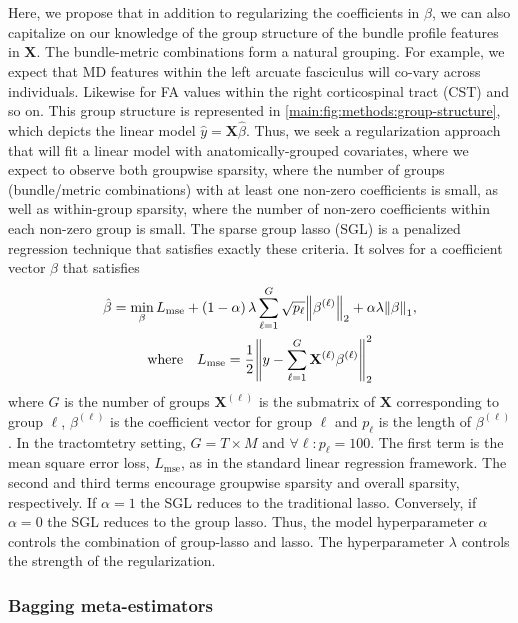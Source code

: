 \documentclass[10pt,%
               aps,%
               prl,%
               preprint,%
               superscriptaddress,%
               preprintnumbers,%
               amsmath,%
               floatfix,%
               endfloats*]{revtex4-2}
\begin{document}
Here, we propose that in addition to regularizing the coefficients in
$\hat{\beta}$, we can also capitalize on our knowledge of the group structure
of the bundle profile features in $\mathbf{X}$. The bundle-metric
combinations form a natural grouping. For example, we expect that MD features
within the left arcuate fasciculus will co-vary across individuals. Likewise
for FA values within the right corticospinal tract (CST) and so on. This
group structure is represented in \cref{main:fig:methods:group-structure}, which
depicts the linear model $\hat{y} = \mathbf{X} \hat{\beta}$. Thus, we seek a
regularization approach that will fit a linear model with
anatomically-grouped covariates, where we expect to observe both groupwise
sparsity, where the number of groups (bundle/metric combinations) with at
least one non-zero coefficients is small, as well as within-group sparsity,
where the number of non-zero coefficients within each non-zero group is
small. The sparse group lasso (SGL) is a penalized regression technique that
satisfies exactly these criteria\cite{simon2013sparse}. It solves for a
coefficient vector $\hat{\beta}$ that satisfies
\begin{multline}
    \hat{\beta} = \min_\beta L_{\text{mse}}
    + \left( 1 - \alpha \right) \lambda \displaystyle \sum_{\ell = 1}^{G}
    \sqrt{p_\ell} \norm{\beta^{(\ell)}}_2
    + \alpha \lambda \norm{\beta}_1,\\%
    \text{where} \quad
    L_{\text{mse}} = \frac{1}{2}
    \norm{y - \displaystyle \sum_{\ell = 1}^{G}
    \mathbf{X}^{(\ell)} \beta^{(\ell)}}_2^2
    \label{eq:sgl}
\end{multline}
where $G$ is the number of groups $\mathbf{X}^{(\ell)}$ is the submatrix of
$\mathbf{X}$ corresponding to group $\ell$, $\beta^{(\ell)}$ is the
coefficient vector for group $\ell$ and $p_\ell$ is the length of
$\beta^{(\ell)}$. In the tractomtetry setting, $G = T \times M$ and $\forall
\ell: p_\ell = 100$. The first term is the mean square error loss,
$L_{\text{mse}}$, as in the standard linear regression framework. The second
and third terms encourage groupwise sparsity and overall sparsity,
respectively. If $\alpha = 1$ the SGL reduces to the traditional
lasso\cite{tibshirani1996regression}. Conversely, if $\alpha = 0$ the SGL
reduces to the group lasso\cite{yuan2006model}. Thus, the model
hyperparameter $\alpha$ controls the combination of group-lasso and lasso.
The hyperparameter $\lambda$ controls the strength of the regularization.

\subsubsection{Bagging meta-estimators}
\end{document}
